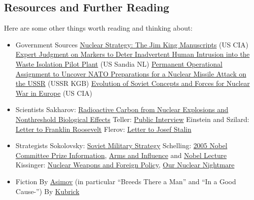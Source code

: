 \documentclass[10pt,oneside]{amsart}
\theoremstyle{definition}
\begin{document}
\subsection*{Resources and Further Reading} Here are some other things worth reading and thinking about:

\begin{itemize}

      \item Government Sources
            \subitem \href{https://tile.loc.gov/storage-services/master/gdc/gdcebookspublic/20/20/43/52/29/2020435229/2020435229.pdf}{Nuclear Strategy: The Jim King Manuscripts} (US CIA)
            \subitem \href{https://wipp.info/921382.pdf}{Expert Judgment on Markers to Deter Inadvertent Human Intrusion into the Waste Isolation Pilot Plant} (US Sandia NL)
            \subitem \href{https://nsarchive.gwu.edu/document/17309-document-09-kgb-headquarters-moscow}{Permanent Operational Assignment to Uncover NATO Preparations for a Nuclear Missile Attack on the USSR} (USSR KGB)
            \subitem \href{https://www.cia.gov/readingroom/docs/1974-05-01.pdf}{Evolution of Soviet Concepts and Forces for Nuclear War in Europe} (US CIA)
      \item Scientists
            \subitem Sakharov: \href{https://scienceandglobalsecurity.org/archive/sgs01sakharov.pdf}{Radioactive Carbon from Nuclear Explosions and Nonthreshold Biological Effects}
            \subitem Teller: \href{https://nsarchive2.gwu.edu/coldwar/interviews/episode-8/teller1.html}{Public Interview}
            \subitem Einstein and Szilard: \href{http://www.fdrlibrary.marist.edu/archives/pdfs/docsworldwar.pdf}{Letter to Franklin Roosevelt}
            \subitem Flerov: \href{https://gist.githubusercontent.com/arnavs/f8de3e483383617ecf9179c2f2a81414/raw/faaa6df63f834965323cbb18232e39ee61c58693/flerov.txt}{Letter to Josef Stalin}
      \item Strategists
            \subitem Sokolovsky: \href{https://www.rand.org/content/dam/rand/pubs/reports/2005/R416.pdf}{Soviet Military Strategy}
            \subitem Schelling: \href{https://www.nobelprize.org/uploads/2018/06/advanced-economicsciences2005.pdf}{2005 Nobel Committee Prize Information}, \href{https://www.jstor.org/stable/j.ctt5vm52s}{Arms and Influence} and \href{https://www.nobelprize.org/uploads/2018/06/schelling-lecture.pdf}{Nobel Lecture}
            \subitem Kissinger: \href{https://api.pageplace.de/preview/DT0400.9780429696350_A37701777/preview-9780429696350_A37701777.pdf}{Nuclear Weapons and Foreign Policy}, \href{https://www.henryakissinger.com/articles/our-nuclear-nightmare/}{Our Nuclear Nightmare}
      \item Fiction
            \subitem By \href{https://ia801405.us.archive.org/10/items/HeliganSecretsOfTheLostGardens/AsimovIsaac-CompleteStories-Volume1.pdf}{Asimov} (in particular ``Breeds There a Man'' and ``In a Good Cause-'')
            \subitem By \href{https://en.wikipedia.org/wiki/Dr._Strangelove}{Kubrick}
\end{itemize}


\end{document}
